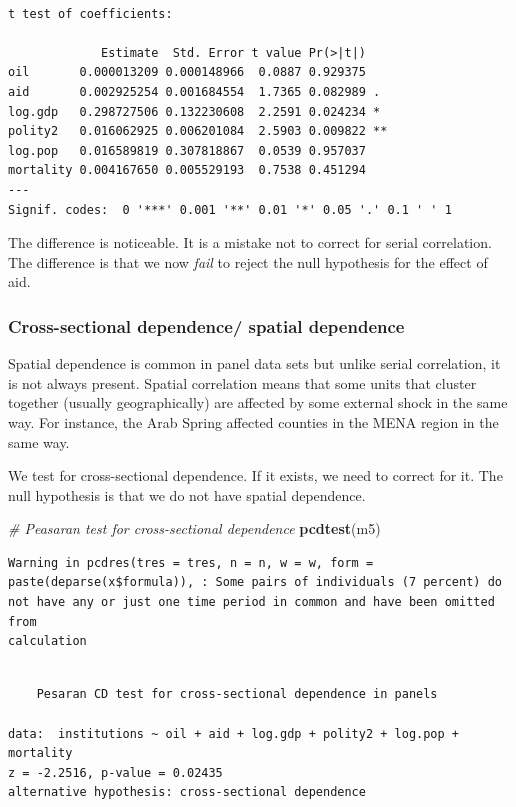 \documentclass[]{article}
\newenvironment{Shaded}{\begin{snugshade}}{\end{snugshade}}
\newcommand{\KeywordTok}[1]{\textcolor[rgb]{0.13,0.29,0.53}{\textbf{#1}}}
\newcommand{\CommentTok}[1]{\textcolor[rgb]{0.56,0.35,0.01}{\textit{#1}}}
\newcommand{\NormalTok}[1]{#1}
\theoremstyle{definition}
\theoremstyle{definition}
\theoremstyle{definition}
\theoremstyle{remark}
\begin{document}
\begin{verbatim}

t test of coefficients:

             Estimate  Std. Error t value Pr(>|t|)   
oil       0.000013209 0.000148966  0.0887 0.929375   
aid       0.002925254 0.001684554  1.7365 0.082989 . 
log.gdp   0.298727506 0.132230608  2.2591 0.024234 * 
polity2   0.016062925 0.006201084  2.5903 0.009822 **
log.pop   0.016589819 0.307818867  0.0539 0.957037   
mortality 0.004167650 0.005529193  0.7538 0.451294   
---
Signif. codes:  0 '***' 0.001 '**' 0.01 '*' 0.05 '.' 0.1 ' ' 1
\end{verbatim}

The difference is noticeable. It is a mistake not to correct for serial
correlation. The difference is that we now \emph{fail} to reject the
null hypothesis for the effect of aid.

\subsubsection{Cross-sectional dependence/ spatial
dependence}\label{cross-sectional-dependence-spatial-dependence}

Spatial dependence is common in panel data sets but unlike serial
correlation, it is not always present. Spatial correlation means that
some units that cluster together (usually geographically) are affected
by some external shock in the same way. For instance, the Arab Spring
affected counties in the MENA region in the same way.

We test for cross-sectional dependence. If it exists, we need to correct
for it. The null hypothesis is that we do not have spatial dependence.

\begin{Shaded}
\begin{Highlighting}[]
\CommentTok{# Peasaran test for cross-sectional dependence}
\KeywordTok{pcdtest}\NormalTok{(m5)}
\end{Highlighting}
\end{Shaded}

\begin{verbatim}
Warning in pcdres(tres = tres, n = n, w = w, form =
paste(deparse(x$formula)), : Some pairs of individuals (7 percent) do
not have any or just one time period in common and have been omitted from
calculation
\end{verbatim}

\begin{verbatim}

    Pesaran CD test for cross-sectional dependence in panels

data:  institutions ~ oil + aid + log.gdp + polity2 + log.pop + mortality
z = -2.2516, p-value = 0.02435
alternative hypothesis: cross-sectional dependence
\end{verbatim}
\end{document}
